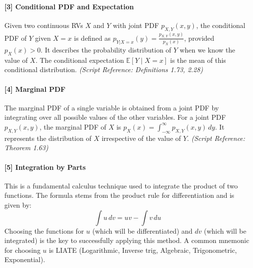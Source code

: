 \documentclass[11pt,a4paper]{article}
\begin{document}
\hypertarget{ref:cond_pdf}{}
\paragraph{[3] Conditional PDF and Expectation}
Given two continuous RVs $X$ and $Y$ with joint PDF $p_{X,Y}(x,y)$, the conditional PDF of $Y$ given $X=x$ is defined as $p_{Y|X=x}(y) = \frac{p_{X,Y}(x,y)}{p_X(x)}$, provided $p_X(x) > 0$. It describes the probability distribution of $Y$ when we know the value of $X$. The conditional expectation $\mathbb{E}[Y \mid X=x]$ is the mean of this conditional distribution.
\textit{(Script Reference: Definitions 1.73, 2.28)}
\vspace{1em}

\hypertarget{ref:marginal}{}
\paragraph{[4] Marginal PDF}
The marginal PDF of a single variable is obtained from a joint PDF by integrating over all possible values of the other variables. For a joint PDF $p_{X,Y}(x,y)$, the marginal PDF of $X$ is $p_X(x) = \int_{-\infty}^\infty p_{X,Y}(x,y) \,dy$. It represents the distribution of $X$ irrespective of the value of $Y$.
\textit{(Script Reference: Theorem 1.63)}
\vspace{1em}

\hypertarget{ref:ibp}{}
\paragraph{[5] Integration by Parts}
This is a fundamental calculus technique used to integrate the product of two functions. The formula stems from the product rule for differentiation and is given by:
\[ \int u \,dv = uv - \int v \,du \]
Choosing the functions for $u$ (which will be differentiated) and $dv$ (which will be integrated) is the key to successfully applying this method. A common mnemonic for choosing $u$ is LIATE (Logarithmic, Inverse trig, Algebraic, Trigonometric, Exponential).
\vspace{1em}
\end{document}
